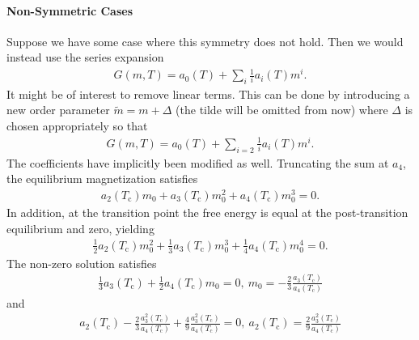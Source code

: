 \paragraph{Non-Symmetric Cases}
Suppose we have some case where this symmetry does not hold. Then we would instead use the series expansion
\begin{align*}
	G(m, T) = a_{0}(T) + \sum\limits_{i}\frac{1}{i}a_{i}(T)m^{i}.
\end{align*}
It might be of interest to remove linear terms. This can be done by introducing a new order parameter $\tilde{m} = m + \Delta$ (the tilde will be omitted from now) where $\Delta$ is chosen appropriately so that
\begin{align*}
	G(m, T) = a_{0}(T) + \sum\limits_{i = 2}\frac{1}{i}a_{i}(T)m^{i}.
\end{align*}
The coefficients have implicitly been modified as well. Truncating the sum at $a_{4}$, the equilibrium magnetization satisfies
\begin{align*}
	a_{2}(T_{\text{c}})m_{0} + a_{3}(T_{\text{c}})m_{0}^{2} + a_{4}(T_{\text{c}})m_{0}^{3} = 0.
\end{align*}
In addition, at the transition point the free energy is equal at the post-transition equilibrium and zero, yielding
\begin{align*}
	\frac{1}{2}a_{2}(T_{\text{c}})m_{0}^{2} + \frac{1}{3}a_{3}(T_{\text{c}})m_{0}^{3} + \frac{1}{4}a_{4}(T_{\text{c}})m_{0}^{4} = 0.
\end{align*}
The non-zero solution satisfies
\begin{align*}
	\frac{1}{3}a_{3}(T_{\text{c}}) + \frac{1}{2}a_{4}(T_{\text{c}})m_{0} = 0,\ m_{0} = -\frac{2}{3}\frac{a_{3}(T_{\text{c}})}{a_{4}(T_{\text{c}})}
\end{align*}
and
\begin{align*}
	a_{2}(T_{\text{c}}) - \frac{2}{3}\frac{a_{3}^{2}(T_{\text{c}})}{a_{4}(T_{\text{c}})} + \frac{4}{9}\frac{a_{3}^{2}(T_{\text{c}})}{a_{4}(T_{\text{c}})} = 0,\ a_{2}(T_{\text{c}}) = \frac{2}{9}\frac{a_{3}^{2}(T_{\text{c}})}{a_{4}(T_{\text{c}})}
\end{align*}
